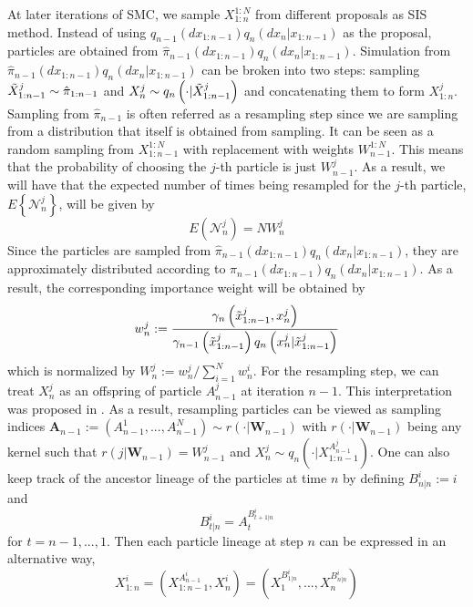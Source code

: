 \documentclass[12pt,a4paper]{article}
\begin{document}
At later iterations of SMC, we sample $X_{1:n}^{1:N}$ from different proposals as SIS method. Instead of using $q_{n-1}(dx_{1:n-1})q_n(dx_n|x_{1:n-1})$ as the proposal, particles are obtained from \(\hat{\pi}_{n-1}(dx_{1:n-1})q_{n}(dx_n|x_{1:n-1})\). Simulation from $\hat{\pi}_{n-1}(dx_{1:n-1})q_{n}(dx_n|x_{1:n-1})$ can be broken into two steps: sampling $\Tilde{X}_{1:n-1}^j \sim \hat{\pi}_{1:n-1}$ and $X_n^j \sim q_n\left(\cdot|\Tilde{X}_{1:n-1}^j\right)$ and concatenating them to form $X_{1:n}^j$. Sampling from $\hat{\pi}_{n-1}$ is often referred as a resampling step since we are sampling from a distribution that itself is obtained from sampling. It can be seen as a random sampling from $X_{1:n-1}^{1:N}$ with replacement with weights $W_{n-1}^{1:N}$. This means that the probability of choosing the $j$-th particle is just $W_{n-1}^j$. As a result, we will have that the expected number of times being resampled for the $j$-th particle, $E\left\{\mathcal{N}_n^j\right\}$, will be given by 
$$E \left(\mathcal{N}_n^j\right) = N W_n^j$$
Since the particles are sampled from $\hat{\pi}_{n-1}(dx_{1:n-1})q_{n}(dx_n|x_{1:n-1})$, they are approximately distributed according to $\pi_{n-1}(dx_{1:n-1})q_n(dx_n|x_{1:n-1})$. As a result, the corresponding importance weight will be obtained by 
\begin{equation}
    \label{SIR - Later Importance Weight}
    w_n^j := \frac{\gamma_n\left(\Tilde{x}_{1:n-1}^j,x_n^j\right)}{\gamma_{n-1}\left(\Tilde{x}_{1:n-1}^j\right)q_n\left(x_n^j|\Tilde{x}_{1:n-1}^j\right)}
\end{equation}
which is normalized by $W_n^j := w_n^j / \sum_{i=1}^{N} w_n^i$. For the resampling step, we can treat $X_n^j$ as an offspring of particle $A_{n-1}^j$ at iteration $n-1$. This interpretation was proposed in \cite{andrieu2010particle}. As a result, resampling particles can be viewed as sampling indices $\mathbf{A}_{n-1}:= \left(A_{n-1}^1,...,A_{n-1}^N\right) \sim r\left(\cdot|\mathbf{W}_{n-1}\right)$ with $r\left(\cdot|\mathbf{W}_{n-1}\right)$ being any kernel such that $r\left(j|\mathbf{W}_{n-1}\right) = W_{n-1}^j$ and $X_n^j \sim q_n\left(\cdot|X_{1:n-1}^{A_{n-1}^j}\right)$. One can also keep track of the ancestor lineage of the particles at time $n$ by defining $B_{n|n}^i := i$ and 
$$B_{t|n}^i = A_{t}^{B_{t+1|n}^i}$$
for $t = n-1,...,1$. Then each particle lineage at step $n$ can be expressed in an alternative way,
$$X_{1:n}^i = \left(X_{1:n-1}^{A_{n-1}^i},X_n^i\right)=\left(X_1^{B_{1|n}^i},...,X_n^{B_{n|n}^i}\right)$$
\end{document}
